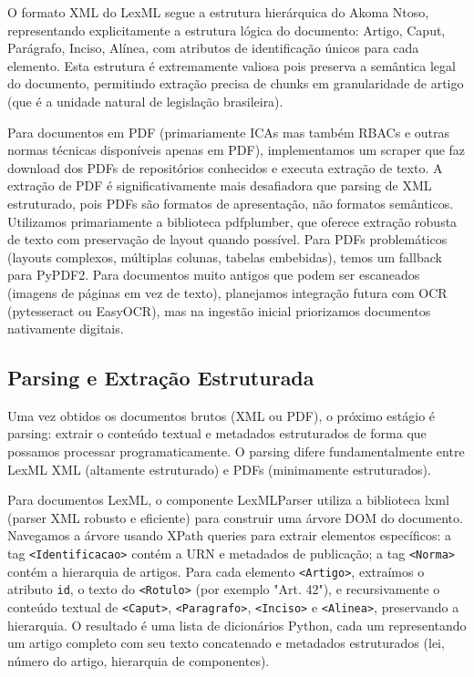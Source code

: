 \documentclass[12pt,a4paper]{article}
\begin{document}
O formato XML do LexML segue a estrutura hierárquica do Akoma Ntoso, representando explicitamente a estrutura lógica do documento: Artigo, Caput, Parágrafo, Inciso, Alínea, com atributos de identificação únicos para cada elemento. Esta estrutura é extremamente valiosa pois preserva a semântica legal do documento, permitindo extração precisa de chunks em granularidade de artigo (que é a unidade natural de legislação brasileira).

Para documentos em PDF (primariamente ICAs mas também RBACs e outras normas técnicas disponíveis apenas em PDF), implementamos um scraper que faz download dos PDFs de repositórios conhecidos e executa extração de texto. A extração de PDF é significativamente mais desafiadora que parsing de XML estruturado, pois PDFs são formatos de apresentação, não formatos semânticos. Utilizamos primariamente a biblioteca pdfplumber, que oferece extração robusta de texto com preservação de layout quando possível. Para PDFs problemáticos (layouts complexos, múltiplas colunas, tabelas embebidas), temos um fallback para PyPDF2. Para documentos muito antigos que podem ser escaneados (imagens de páginas em vez de texto), planejamos integração futura com OCR (pytesseract ou EasyOCR), mas na ingestão inicial priorizamos documentos nativamente digitais.

\subsection{Parsing e Extração Estruturada}

Uma vez obtidos os documentos brutos (XML ou PDF), o próximo estágio é parsing: extrair o conteúdo textual e metadados estruturados de forma que possamos processar programaticamente. O parsing difere fundamentalmente entre LexML XML (altamente estruturado) e PDFs (minimamente estruturados).

Para documentos LexML, o componente LexMLParser utiliza a biblioteca lxml (parser XML robusto e eficiente) para construir uma árvore DOM do documento. Navegamos a árvore usando XPath queries para extrair elementos específicos: a tag \texttt{<Identificacao>} contém a URN e metadados de publicação; a tag \texttt{<Norma>} contém a hierarquia de artigos. Para cada elemento \texttt{<Artigo>}, extraímos o atributo \texttt{id}, o texto do \texttt{<Rotulo>} (por exemplo "Art. 42"), e recursivamente o conteúdo textual de \texttt{<Caput>}, \texttt{<Paragrafo>}, \texttt{<Inciso>} e \texttt{<Alinea>}, preservando a hierarquia. O resultado é uma lista de dicionários Python, cada um representando um artigo completo com seu texto concatenado e metadados estruturados (lei, número do artigo, hierarquia de componentes).
\end{document}
